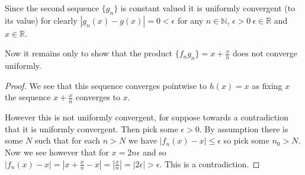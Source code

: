\documentclass[12pt]{article}
\begin{document}
Since the second sequence $\{g_n\}$ is constant valued it is uniformly convergent (to its value) for clearly $|g_n(x)-g(x)|= 0 < \epsilon$ for any $n \in \mathbb{N}$, $\epsilon>0\ \epsilon \in \mathbb{R}$ and $x \in \mathbb{R}$.

Now it remains only to show that the product $\{f_n g_n \} = x + \frac{x}{n} $ does not converge uniformly. 

\begin{proof}We see that this sequence converges pointwise to $h(x) = x$ as fixing $x$ the sequence $x+\frac{x}{n} $ converges to $ x$.

However this is not uniformly convergent, for suppose towards a contradiction that it is uniformly convergent.  Then pick some $\epsilon > 0$. By assumption there is some $N$ such that for each $n>N$ we have $|f_n(x)-x| \leq \epsilon$ so pick some $n_0 > N$. Now we see however that for $x = 2 n\epsilon$ and so $|f_n(x)-x|=|x+\frac{x}{n}-x|=|\frac{x}{n}|=|2 \epsilon|>\epsilon$. This is a contradiction.\end{proof}
\end{document}
